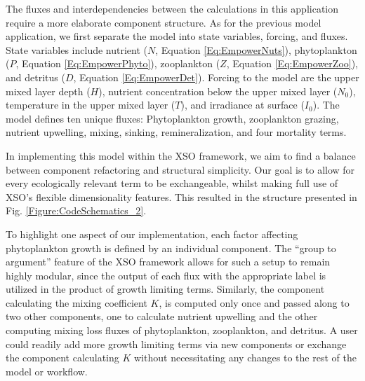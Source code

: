 \documentclass[journal abbreviation, manuscript]{copernicus}
\begin{document}
The fluxes and interdependencies between the calculations in this application require a more elaborate component structure. As for the previous model application, we first separate the model into state variables, forcing, and fluxes.  State variables include nutrient ($N$, Equation \ref{Eq:EmpowerNuts}), phytoplankton ($P$, Equation \ref{Eq:EmpowerPhyto}), zooplankton ($Z$, Equation \ref{Eq:EmpowerZoo}), and detritus ($D$, Equation \ref{Eq:EmpowerDet}). Forcing to the model are the upper mixed layer depth ($H$), nutrient concentration below the upper mixed layer ($N_0$), temperature in the upper mixed layer ($T$), and irradiance at surface ($I_{0}$). The model defines ten unique fluxes: Phytoplankton growth, zooplankton grazing, nutrient upwelling, mixing, sinking, remineralization, and four mortality terms.

In implementing this model within the XSO framework, we aim to find a balance between component refactoring and structural simplicity. Our goal is to allow for every ecologically relevant term to be exchangeable, whilst making full use of XSO's flexible dimensionality features. This resulted in the structure presented in Fig. \ref{Figure:CodeSchematics_2}.

To highlight one aspect of our implementation, each factor affecting phytoplankton growth is defined by an individual component. The “group to argument” feature of the XSO framework allows for such a setup to remain highly modular, since the output of each flux with the appropriate label is utilized in the product of growth limiting terms. 
Similarly, the component calculating the mixing coefficient $K$, is computed only once and passed along to two other components, one to calculate nutrient upwelling and the other computing mixing loss fluxes of phytoplankton, zooplankton, and detritus. A user could readily add more growth limiting terms via new components or exchange the component calculating $K$ without necessitating any changes to the rest of the model or workflow.
\end{document}
